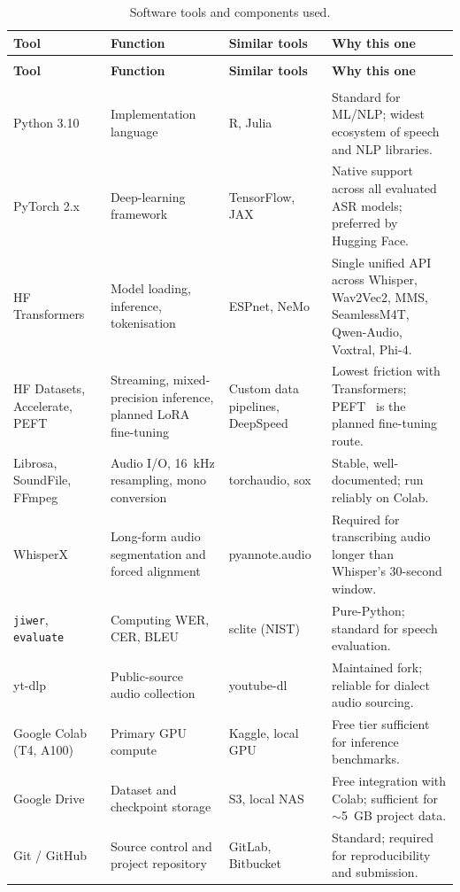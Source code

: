 \documentclass[12pt,a4paper]{article}
\begin{document}
\renewcommand{\arraystretch}{1.2}
\footnotesize
\begin{longtable}{>{\raggedright\arraybackslash}p{2.6cm}
                  >{\raggedright\arraybackslash}p{3.3cm}
                  >{\raggedright\arraybackslash}p{2.7cm}
                  >{\raggedright\arraybackslash}p{4.6cm}}
\caption{Software tools and components used.}\label{tab:tools}\\
\toprule
\textbf{Tool} & \textbf{Function} & \textbf{Similar tools} & \textbf{Why this one} \\
\midrule
\endfirsthead
\multicolumn{4}{c}{\itshape Table~\ref{tab:tools} continued}\\
\toprule
\textbf{Tool} & \textbf{Function} & \textbf{Similar tools} & \textbf{Why this one} \\
\midrule
\endhead
\midrule
\multicolumn{4}{r}{\itshape continued on next page}\\
\endfoot
\bottomrule
\endlastfoot
Python 3.10 & Implementation language & R, Julia & Standard for ML/NLP; widest ecosystem of speech and NLP libraries. \\
PyTorch 2.x & Deep-learning framework & TensorFlow, JAX & Native support across all evaluated ASR models; preferred by Hugging Face. \\
HF Transformers~\cite{pd:transformers} & Model loading, inference, tokenisation & ESPnet, NeMo & Single unified API across Whisper, Wav2Vec2, MMS, SeamlessM4T, Qwen-Audio, Voxtral, Phi-4. \\
HF Datasets, Accelerate, PEFT & Streaming, mixed-precision inference, planned LoRA fine-tuning & Custom data pipelines, DeepSpeed & Lowest friction with Transformers; PEFT~\cite{pd:lora} is the planned fine-tuning route. \\
Librosa, SoundFile, FFmpeg & Audio I/O, 16~kHz resampling, mono conversion & torchaudio, sox & Stable, well-documented; run reliably on Colab. \\
WhisperX~\cite{pd:whisperx} & Long-form audio segmentation and forced alignment & pyannote.audio & Required for transcribing audio longer than Whisper's 30-second window. \\
\texttt{jiwer}, \texttt{evaluate} & Computing WER, CER, BLEU & sclite (NIST) & Pure-Python; standard for speech evaluation. \\
yt-dlp & Public-source audio collection & youtube-dl & Maintained fork; reliable for dialect audio sourcing. \\
Google Colab (T4, A100) & Primary GPU compute & Kaggle, local GPU & Free tier sufficient for inference benchmarks. \\
Google Drive & Dataset and checkpoint storage & S3, local NAS & Free integration with Colab; sufficient for $\sim$5~GB project data. \\
Git / GitHub & Source control and project repository & GitLab, Bitbucket & Standard; required for reproducibility and submission. \\
\end{longtable}
\normalsize
\end{document}
